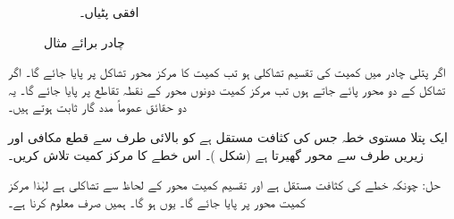 \begin{figure}
\begin{subfigure}{0.3\textwidth}
\caption{افقی پٹیاں۔}
\end{subfigure}
\caption{چادر برائے مثال }
\label{شکل_مثال_تکمل_استعمال_چادر_کثافت}
\end{figure}

اگر پتلی چادر میں کمیت کی تقسیم تشاکلی ہو تب کمیت کا مرکز محور تشاکل پر پایا جائے گا۔ اگر تشاکل کے دو محور پائے جاتے ہوں تب مرکز کمیت دونوں محور کے نقطہ تقاطع پر پایا جائے گا۔ یہ دو حقائق عموماً مدد گار ثابت ہوتے ہیں۔

ایک پتلا مستوی خطہ جس کی کثافت مستقل  ہے کو بالائی طرف سے قطع مکافی  اور زیریں طرف سے محور   گھیرتا ہے (شکل )۔ اس خطے کا مرکز کمیت تلاش کریں۔

حل:\quad
چونکہ  خطے کی کثافت مستقل ہے اور تقسیم کمیت محور  کے لحاظ سے تشاکلی ہے لہٰذا مرکز کمیت محور  پر پایا جائے گا۔ یوں  ہو گا۔ ہمیں صرف  معلوم کرنا ہے۔

